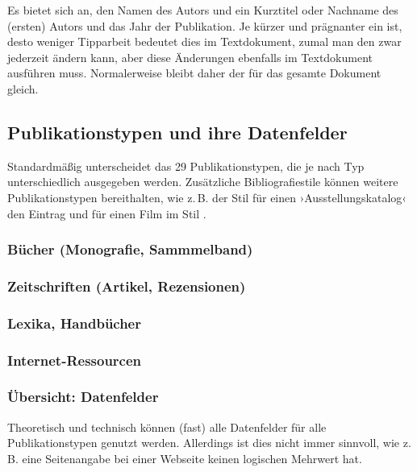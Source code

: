 Es bietet sich an, den Namen des Autors und ein Kurztitel oder Nachname des (ersten) Autors und das Jahr der Publikation. 
Je kürzer und prägnanter ein  ist, desto weniger Tipparbeit bedeutet dies im Textdokument, zumal man den  zwar jederzeit ändern kann, aber diese Änderungen ebenfalls im Textdokument ausführen muss. 
Normalerweise bleibt daher der  für das gesamte Dokument gleich.

\subsection{Publikationstypen und ihre Datenfelder}\label{lit:publikationstypus}
Standardmäßig unterscheidet das  29 %
Publikationstypen, die je nach Typ unterschiedlich ausgegeben werden.
Zusätzliche Bibliografiestile können weitere Publikationstypen bereithalten,
wie z.\,B. der Stil  für einen ›Ausstellungskatalog‹ den Eintrag  und  für einen Film im Stil .


\subsubsection{Bücher (Monografie, Sammmelband)}

\subsubsection{Zeitschriften (Artikel, Rezensionen)}

\subsubsection{Lexika, Handbücher}
\subsubsection{Internet-Ressourcen}

\subsubsection{Übersicht: Datenfelder}
Theoretisch und technisch können (fast) alle Datenfelder für alle Publikationstypen genutzt werden.
Allerdings ist dies nicht immer sinnvoll, wie z.\,B. eine Seitenangabe bei einer Webseite keinen logischen Mehrwert hat.


